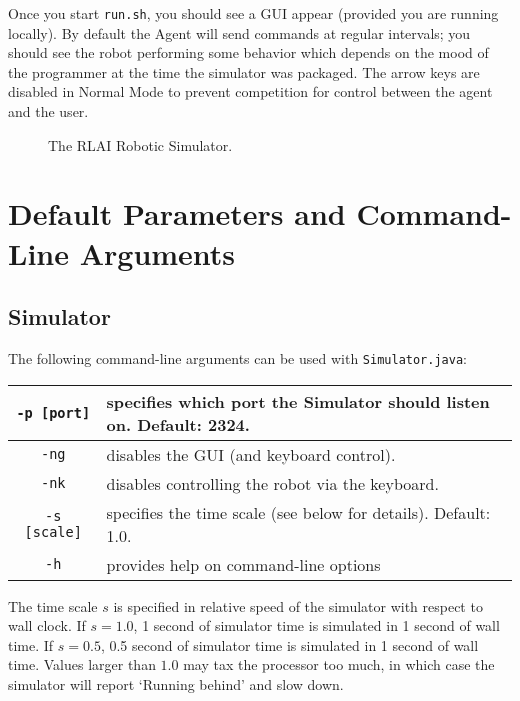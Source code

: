\documentclass[12pt]{article}
\begin{document}
Once you start \verb+run.sh+, you should see a GUI appear (provided you are
running locally). By default the Agent will send commands at regular intervals;
you should see the robot performing some behavior which depends on the mood
of the programmer at the time the simulator was packaged. The arrow keys are
disabled in Normal Mode to prevent competition for control between the agent
and the user. 

\begin{figure}
\centerline{
}
\caption{The RLAI Robotic Simulator.}
\end{figure}

\section{Default Parameters and Command-Line Arguments\label{sec:changingDefaults}}

\subsection{Simulator}\label{subsec:simulator_parameters}

The following command-line arguments can be used with \verb+Simulator.java+:

\begin{center}
\begin{tabular}{|c|l|}
\hline
\verb+-p [port]+ & specifies which port the Simulator should listen on. Default: 2324. \\
\hline
\verb+-ng+ & disables the GUI (and keyboard control). \\
\hline
\verb+-nk+ & disables controlling the robot via the keyboard. \\
\hline
\verb+-s [scale]+ & specifies the time scale (see below for details). Default: 1.0. \\
\hline
\verb+-h+ & provides help on command-line options \\ 
\hline
\end{tabular}
\end{center}

The time scale $s$ is specified in relative speed of the simulator with respect 
to wall clock. If $s=1.0$, 1 second of simulator time is simulated in 1 second
of wall time. If $s=0.5$, 0.5 second of simulator time is simulated in 1
second of wall time. Values larger than $1.0$ may tax the processor too much,
in which case the simulator will report `Running behind' and slow down.
\end{document}
